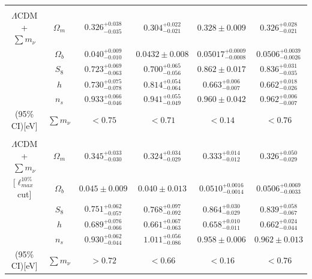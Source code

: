 \begin{table}
{\begin{tabular}{cccccc}
       \hline\\[0.05cm]
       
      $\Lambda$CDM + $\sum m_{\nu}$ & $\Omega_m$ & $0.326^{+0.038}_{-0.035}$ & $0.304^{+0.022}_{-0.021}$ & $0.328 \pm 0.009$ & $0.326^{+0.028}_{-0.021}$\\[0.1cm]        
		[$\ell_{max}^{5\%}$ cut]& $\Omega_b$ & $0.040^{+0.009}_{-0.010} $ & $0.0432 \pm 0.008 $ & $0.05017^{+0.0009}_{-0.0008}$ & $0.0506^{+0.0039}_{-0.0026}$\\[0.1cm]      
		& $S_8$ & $0.723^{+0.069}_{-0.063}$  & $0.700^{+0.065}_{-0.056}$  & $0.862\pm 0.017$  & $0.836^{+0.031}_{-0.035}$\\[0.1cm]      
		& $h$ & $0.730^{+0.075}_{-0.078}$ & $0.814^{+0.054}_{-0.064}$ & $0.663^{+0.006}_{-0.007}$& $0.662^{+0.018}_{-0.026}$ \\[0.1cm]      
		& $n_s$ & $0.933^{+0.066}_{-0.046}$ & $0.941^{+0.055}_{-0.049}$ & $0.960 \pm 0.042$ & $ 0.962^{+0.006}_{-0.007} $ \\[0.1cm]      	 
       (95\% CI)[eV] & $\sum m_{\nu}$ & $ < 0.75 $ & $ < 0.71 $ &  $ < 0.14 $ & $ < 0.76 $ \\[0.1cm]
       
       \hline \\[0.05cm]
      $\Lambda$CDM + $\sum m_{\nu}$ & $\Omega_m$ & $0.345^{+0.033}_{-0.030}$ & $0.324^{+0.034}_{-0.029}$ & $0.333^{+0.014}_{-0.012}$ & $0.326^{+0.050}_{-0.029}$ \\[0.1cm] 
        
		[$\ell_{max}^{10\%}$ cut]& $\Omega_b$ &  $0.045 \pm 0.009$  & $0.040\pm 0.013$ & $ 0.0510^{+0.0016}_{-0.0014}$ & $0.0506^{+0.0069}_{-0.0033}$  \\[0.1cm] 
        
		& $S_8$ & $0.751^{+0.062}_{-0.057}$ & $0.768^{+0.097}_{-0.092}$ & $0.864^{+0.030}_{-0.029}$ & $0.839^{+0.058}_{-0.067}$  \\[0.1cm] 
        
		& $h$ &  $0.689^{+0.076}_{-0.066}$ & $0.661^{+0.067}_{-0.063}$ & $0.658^{+0.010}_{-0.011}$ & $0.662^{+0.024}_{-0.044}$ \\[0.1cm] 
        
		& $n_s$ & $0.930^{+0.062}_{-0.044}$ & $1.011^{+0.056}_{-0.086}$ &  $0.958 \pm 0.006$ & $0.962\pm 0.013$ \\[0.1cm]
		
        (95\% CI)[eV] & $\sum m_{\nu}$  & $>0.72$ & $< 0.66 $ &  $ < 0.16 $ & $ < 0.76 $ \\[0.1cm]
		\hline
		\hline
    \end{tabular}}
\end{table}








